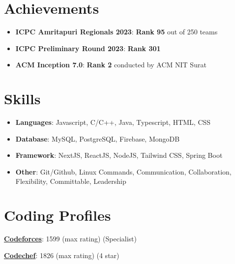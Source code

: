 \documentclass[letterpaper,11pt]{article}
\newcommand{\resumeItem}[2]{
  \item\small{
    \textbf{#1}: #2 \vspace{-2pt}
  }
}
\newcommand{\resumeSubItem}[2]{
  \resumeItem{#1}{#2}\vspace{-4pt}
}
\newcommand{\resumeSubHeadingListStart}{
  \begin{itemize}[leftmargin=*]
}
\newcommand{\resumeSubHeadingListEnd}{
  \end{itemize}
}
\begin{document}
\section{Achievements}
\resumeSubHeadingListStart
  \resumeSubItem
    {ICPC Amritapuri Regionals 2023}
    {\textbf{Rank 95} out of 250 teams}
  \resumeSubItem
    {ICPC Preliminary Round 2023}
    {\textbf{Rank 301}}
  \resumeSubItem
    {ACM Inception 7.0}
    {\textbf{Rank 2} conducted by ACM NIT Surat}
\resumeSubHeadingListEnd

\section{Skills}
\resumeSubHeadingListStart
  \resumeSubItem
    {Languages}
    {Javascript, C/C++, Java, Typescript, HTML, CSS}
  \resumeSubItem
    {Database}
    {MySQL, PostgreSQL, Firebase, MongoDB}
  \resumeSubItem
    {Framework}
    {NextJS, ReactJS, NodeJS, Tailwind CSS, Spring Boot}
  \resumeSubItem
    {Other}
    {Git/Github, Linux Commands, Communication, Collaboration, Flexibility, Committable, Leadership}
\resumeSubHeadingListEnd

\section{Coding Profiles}
\resumeSubHeadingListStart
  \begin{minipage}[t]{0.48\linewidth}
    \resumeSubItem
      {\href{https://codeforces.com/profile/kaushik.bhowmick}{Codeforces}}
      {1599 (max rating) (Specialist)}
  \end{minipage}%
  \begin{minipage}[t]{0.48\linewidth}
    \resumeSubItem
      {\href{https://www.codechef.com/users/foolish_cow}{Codechef}}
      {1826 (max rating) (4 star)}
  \end{minipage}
\resumeSubHeadingListEnd
\end{document}
